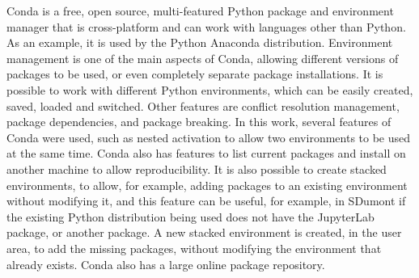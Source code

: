 Conda \cite {Gruening2018} is a free, open source, multi-featured Python package and environment manager that is cross-platform and can work with languages other than Python. As an example, it is used by the Python Anaconda distribution. Environment management is one of the main aspects of Conda, allowing different versions of packages to be used, or even completely separate package installations. It is possible to work with different Python environments, which can be easily created, saved, loaded and switched. Other features are conflict resolution management, package dependencies, and package breaking. In this work, several features of Conda were used, such as nested activation to allow two environments to be used at the same time. Conda also has features to list current packages and install on another machine to allow reproducibility. It is also possible to create stacked environments, to allow, for example, adding packages to an existing environment without modifying it, and this feature can be useful, for example, in SDumont if the existing Python distribution being used does not have the JupyterLab package, or another package. A new stacked environment is created, in the user area, to add the missing packages, without modifying the environment that already exists. Conda also has a large online package repository.
